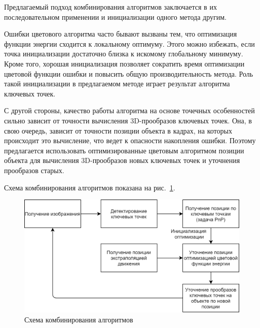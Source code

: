 
Предлагаемый подход комбинирования алгоритмов заключается в их последовательном
применении и инициализации одного метода другим.

Ошибки цветового алгоритма часто бывают вызваны тем, что оптимизация функции
энергии сходится к локальному оптимуму.
Этого можно избежать, если точка инициализации достаточно близка к искомому
глобальному минимуму.
Кроме того, хорошая инициализация позволяет сократить время оптимизации
цветовой функции ошибки и повысить общую производительность метода.
Роль такой инициализации в предлагаемом методе играет результат алгоритма
ключевых точек.

С другой стороны, качество работы алгоритма на основе точечных особенностей
сильно зависит от точности вычисления 3D-прообразов ключевых точек.
Она, в свою очередь, зависит от точности позиции объекта в кадрах, на которых
происходит это вычисление, что ведет к опасности накопления ошибки.
Поэтому предлагается использовать оптимизированные цветовым алгоритмом позиции
объекта для вычисления 3D-прообразов новых ключевых точек и уточнения
прообразов старых.

\newcommand{\XOld}{\ensuremath{\xvec_{\text {\it old}}}}
\newcommand{\XNew}{\ensuremath{\xvec_{\text{\it new}}}}
\newcommand{\ReprErr}[1]{\ensuremath{\vect{e}( #1 )}}

Схема комбинирования алгоритмов показана на рис.~\ref{fig:combining_schema}.

\begin{figure}[t]
    \centering
    \includegraphics[width=\textwidth]{fig/combining_schema.png}
    \caption{
        Схема комбинирования алгоритмов
    }
    \label{fig:combining_schema}
\end{figure}

